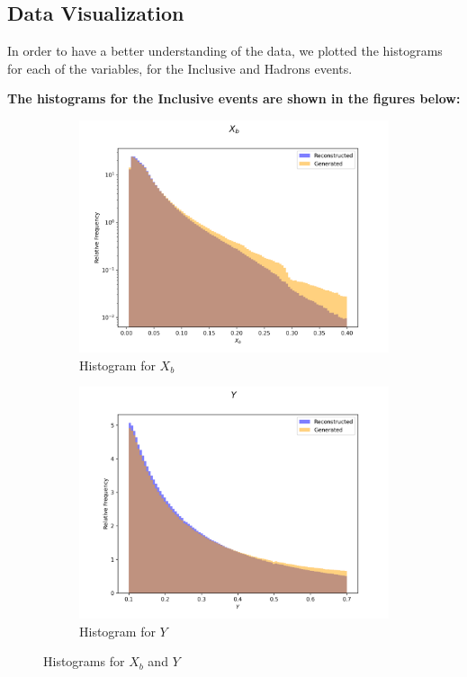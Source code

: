 \documentclass{article}
\begin{document}
\subsection{Data Visualization}
In order to have a better understanding of the data, we plotted the histograms for each of the variables, for the Inclusive and Hadrons events.

\textbf{The histograms for the Inclusive events are shown in the figures below:}

\begin{figure}[H]
    \centering
    \begin{subfigure}[b]{0.45\textwidth}
        \includegraphics[width=\textwidth]{graphs/incl_X_b.png}
        \caption{Histogram for $X_b$}
        \label{fig:incl_X_b}
    \end{subfigure}
    \hfill
    \begin{subfigure}[b]{0.45\textwidth}
        \includegraphics[width=\textwidth]{graphs/incl_Y.png}
        \caption{Histogram for $Y$}
        \label{fig:incl_Y}
    \end{subfigure}
    \caption{Histograms for $X_b$ and $Y$}
\end{figure}
\end{document}

